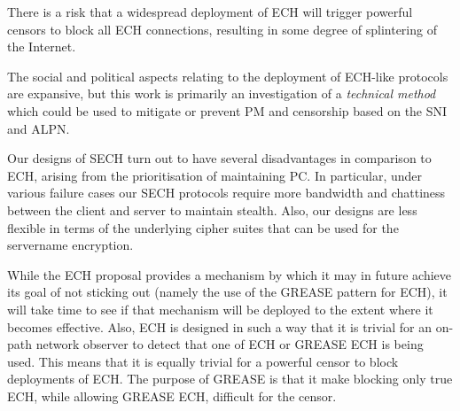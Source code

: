 There is a risk that a widespread deployment of \ac{ECH} will trigger powerful censors to block
all \ac{ECH} connections,
resulting in some
degree of splintering of the Internet.

The social and political aspects relating to the
deployment of \ac{ECH}-like protocols are expansive,
but this work is primarily an investigation of a {\em technical method}
which could be used to mitigate or prevent \ac{PM} and censorship
based on the \ac{SNI} and \ac{ALPN}.

Our designs of \ac{SECH} turn out to have several
disadvantages in comparison to \ac{ECH},
arising from the prioritisation of maintaining \ac{PC}.
In particular, under various failure cases our \ac{SECH}
protocols
require more bandwidth and chattiness between the client
and server to maintain stealth.
Also, our designs are less flexible in terms of
the underlying cipher suites that can be used for
the servername encryption.







While the \ac{ECH} proposal provides a mechanism
by which it may in future achieve its goal
of not sticking out (namely the use of the \ac{GREASE} pattern for \ac{ECH}),
it will take time to see if that mechanism
will be deployed to the extent where it becomes effective.
Also, \ac{ECH} is designed in such a way that it
is trivial for an on-path network observer to
detect that one of \ac{ECH} or \ac{GREASE} \ac{ECH}
is being used.
This means that it is equally trivial for a powerful
censor to block deployments of \ac{ECH}.
The purpose of \ac{GREASE} is that it make blocking only true \ac{ECH}, while allowing
\ac{GREASE} \ac{ECH}, difficult for the censor.

